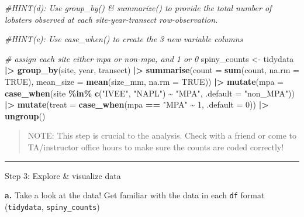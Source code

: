 \documentclass[
]{article}
\newenvironment{Shaded}{\begin{snugshade}}{\end{snugshade}}
\newcommand{\AttributeTok}[1]{\textcolor[rgb]{0.13,0.29,0.53}{#1}}
\newcommand{\CommentTok}[1]{\textcolor[rgb]{0.56,0.35,0.01}{\textit{#1}}}
\newcommand{\ConstantTok}[1]{\textcolor[rgb]{0.56,0.35,0.01}{#1}}
\newcommand{\DecValTok}[1]{\textcolor[rgb]{0.00,0.00,0.81}{#1}}
\newcommand{\FunctionTok}[1]{\textcolor[rgb]{0.13,0.29,0.53}{\textbf{#1}}}
\newcommand{\NormalTok}[1]{#1}
\newcommand{\OtherTok}[1]{\textcolor[rgb]{0.56,0.35,0.01}{#1}}
\newcommand{\SpecialCharTok}[1]{\textcolor[rgb]{0.81,0.36,0.00}{\textbf{#1}}}
\newcommand{\StringTok}[1]{\textcolor[rgb]{0.31,0.60,0.02}{#1}}
\begin{document}
\begin{Shaded}
\begin{Highlighting}[]
\CommentTok{\#HINT(d): Use \textasciigrave{}group\_by()\textasciigrave{} \& \textasciigrave{}summarize()\textasciigrave{} to provide the total number of lobsters observed at each site{-}year{-}transect row{-}observation. }

\CommentTok{\#HINT(e): Use \textasciigrave{}case\_when()\textasciigrave{} to create the 3 new variable columns}

\CommentTok{\# assign each site either mpa or non{-}mpa, and 1 or 0}
\NormalTok{spiny\_counts }\OtherTok{\textless{}{-}}\NormalTok{ tidydata }\SpecialCharTok{|\textgreater{}}
    \FunctionTok{group\_by}\NormalTok{(site, year, transect) }\SpecialCharTok{|\textgreater{}}
    \FunctionTok{summarise}\NormalTok{(}\AttributeTok{count =} \FunctionTok{sum}\NormalTok{(count, }\AttributeTok{na.rm =} \ConstantTok{TRUE}\NormalTok{), }\AttributeTok{mean\_size =} \FunctionTok{mean}\NormalTok{(size\_mm, }\AttributeTok{na.rm =} \ConstantTok{TRUE}\NormalTok{)) }\SpecialCharTok{|\textgreater{}}
    \FunctionTok{mutate}\NormalTok{(}\AttributeTok{mpa =} \FunctionTok{case\_when}\NormalTok{(site }\SpecialCharTok{\%in\%} \FunctionTok{c}\NormalTok{(}\StringTok{"IVEE"}\NormalTok{, }\StringTok{"NAPL"}\NormalTok{) }\SpecialCharTok{\textasciitilde{}} \StringTok{"MPA"}\NormalTok{,}
                           \AttributeTok{.default =} \StringTok{"non\_MPA"}\NormalTok{)) }\SpecialCharTok{|\textgreater{}}
    \FunctionTok{mutate}\NormalTok{(}\AttributeTok{treat =} \FunctionTok{case\_when}\NormalTok{(mpa }\SpecialCharTok{==} \StringTok{"MPA"} \SpecialCharTok{\textasciitilde{}} \DecValTok{1}\NormalTok{,}
                             \AttributeTok{.default =} \DecValTok{0}\NormalTok{)) }\SpecialCharTok{|\textgreater{}}
    \FunctionTok{ungroup}\NormalTok{()}
\end{Highlighting}
\end{Shaded}

\begin{quote}
NOTE: This step is crucial to the analysis. Check with a friend or come
to TA/instructor office hours to make sure the counts are coded
correctly!
\end{quote}

\begin{center}\rule{0.5\linewidth}{0.5pt}\end{center}

Step 3: Explore \& visualize data

\textbf{a.} Take a look at the data! Get familiar with the data in each
\texttt{df} format (\texttt{tidydata}, \texttt{spiny\_counts})
\end{document}
